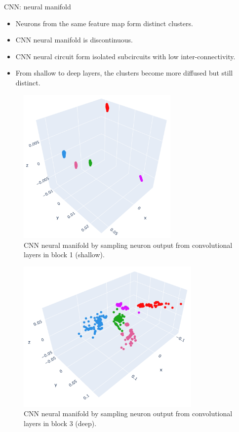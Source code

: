 \documentclass[xcolor={dvipsnames,svgnames}]{beamer}
\begin{document}
\begin{frame}{CNN: neural manifold}
\begin{itemize}
    \item Neurons from the same feature map form distinct clusters.
    \item CNN neural manifold is discontinuous.
    \item CNN neural circuit form isolated subcircuits with low inter-connectivity.
    \item From shallow to deep layers, the clusters become more diffused but still distinct. 
\end{itemize}

    \begin{minipage}[t]{.5\linewidth}  
    \begin{figure}
            \includegraphics[width=0.7\textwidth]{figures/embeddings/VGG16-2D-block1.png}
             \caption{CNN neural manifold by sampling neuron output from convolutional layers in block 1 (shallow).}
        \end{figure} 
    \end{minipage}
      \begin{minipage}[t]{.48\linewidth}   
      \begin{figure}         \includegraphics[width=0.8\textwidth]{figures/embeddings/VGG16-2D-block3.png}
      \caption{CNN neural manifold by sampling neuron output from convolutional layers in block 3 (deep).}
            \end{figure} 
    \end{minipage}
\end{frame}
\end{document}
